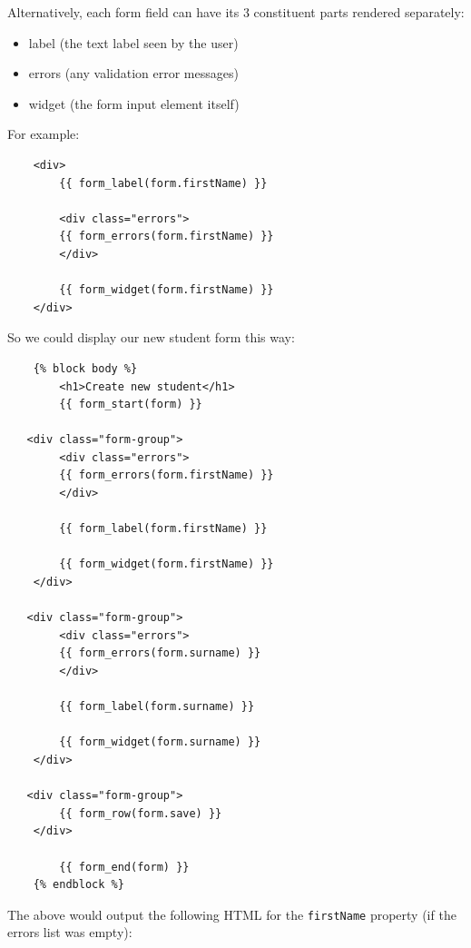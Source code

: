 \documentclass[a4paperpaper,openright]{book}
\providecommand{\tightlist}{%
  \setlength{\itemsep}{0pt}\setlength{\parskip}{0pt}}
\begin{document}
Alternatively, each form field can have its 3 constituent parts rendered
separately:

\begin{itemize}
\tightlist
\item
  label (the text label seen by the user)
\item
  errors (any validation error messages)
\item
  widget (the form input element itself)
\end{itemize}

For example:

\begin{verbatim}
    <div>
        {{ form_label(form.firstName) }}

        <div class="errors">
        {{ form_errors(form.firstName) }}
        </div>

        {{ form_widget(form.firstName) }}
    </div>
\end{verbatim}

So we could display our new student form this way:

\begin{verbatim}
    {% block body %}
        <h1>Create new student</h1>
        {{ form_start(form) }}

   <div class="form-group">
        <div class="errors">
        {{ form_errors(form.firstName) }}
        </div>

        {{ form_label(form.firstName) }}

        {{ form_widget(form.firstName) }}
    </div>

   <div class="form-group">
        <div class="errors">
        {{ form_errors(form.surname) }}
        </div>

        {{ form_label(form.surname) }}

        {{ form_widget(form.surname) }}
    </div>

   <div class="form-group">
        {{ form_row(form.save) }}
    </div>

        {{ form_end(form) }}
    {% endblock %}
\end{verbatim}

The above would output the following HTML for the \texttt{firstName}
property (if the errors list was empty):
\end{document}
